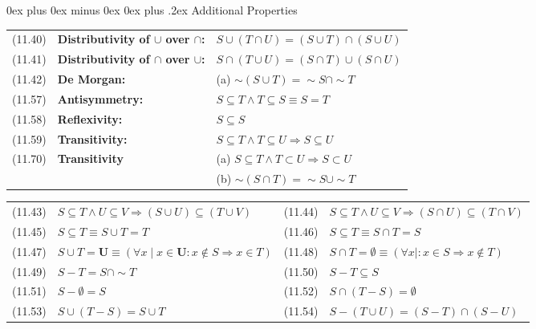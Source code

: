 \documentclass[letterpaper, 8pt]{extarticle}
\makeatletter
\renewcommand{\subsection}{\@startsection{subsection}{2}{0mm}%
                                {0ex plus 0ex minus 0ex}%
                                {0ex plus .2ex}%
                                {\normalfont\small\bfseries}}
\newcommand{\To}{\Rightarrow}
\makeatother
\begin{document}
\begin{multicols*}{3}
    \subsection{Additional Properties}
    \begin{tabulary}{\linewidth}{@{}lLL@{}}
        (11.40) & \textbf{Distributivity of $\cup$ over $\cap$:} & $S \cup (T \cap U) = (S \cup T) \cap (S \cup U)$ \\
        (11.41) & \textbf{Distributivity of $\cap$ over $\cup$:} & $S \cap (T \cup U) = (S \cap T) \cup (S \cap U)$ \\
        (11.42) & \textbf{De Morgan:} & (a) $\sim (S \cup T) = \sim S \cap \sim T$ \\
        (11.57) & \textbf{Antisymmetry:} & $S \subseteq T \land T \subseteq S \equiv S = T$ \\
        (11.58) & \textbf{Reflexivity:} & $S \subseteq S$ \\
        (11.59) & \textbf{Transitivity:} & $S \subseteq T \land T \subseteq U \To S \subseteq U$ \\
        (11.70) & \textbf{Transitivity} & (a) $S \subseteq T \land T \subset U \To S \subset U$ \\
        & & (b) $\sim (S \cap T) = \sim S \cup \sim T$ \\
    \end{tabulary}
    \begin{tabulary}{\linewidth}{@{}lLlL@{}}
        (11.43) & $S \subseteq T \land U \subseteq V \To (S \cup U) \subseteq (T \cup V)$ &
        (11.44) & $S \subseteq T \land U \subseteq V \To (S \cap U) \subseteq (T \cap V)$ \\
        (11.45) & $S \subseteq T \equiv S \cup T = T$ &
        (11.46) & $S \subseteq T \equiv S \cap T = S$ \\
        (11.47) & $S \cup T = \mathbf{U} \equiv (\forall x \mid x \in \mathbf{U} : x \notin S \To x \in T)$ &
        (11.48) & $S \cap T = \emptyset \equiv (\forall x \mid : x \in S \To x \notin T)$ \\
        (11.49) & $S - T = S \cap \sim T$ &
        (11.50) & $S - T \subseteq S$ \\
        (11.51) & $S - \emptyset = S$ &
        (11.52) & $S \cap (T - S) = \emptyset$ \\
        (11.53) & $S \cup (T - S) = S \cup T$ &
        (11.54) & $S - (T \cup U) = (S - T) \cap (S - U)$ \\

\end{tabulary}
\end{multicols*}
\end{document}
